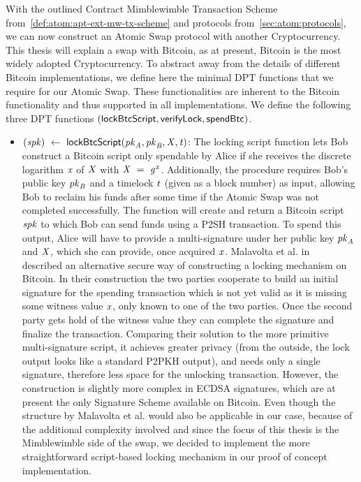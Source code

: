 With the outlined Contract Mimblewimble Transaction Scheme from~\cref{def:atom:apt-ext-mw-tx-scheme} and protocols from~\cref{sec:atom:protocols}, we can now construct an Atomic Swap protocol with another Cryptocurrency.
This thesis will explain a swap with Bitcoin, as at present, Bitcoin is the most widely adopted Cryptocurrency.
To abstract away from the details of different Bitcoin implementations, we define here the minimal DPT functions that we require for our Atomic Swap.
These functionalities are inherent to the Bitcoin functionality and thus supported in all implementations.
We define the following three DPT functions $(\mathsf{lockBtcScript}, \mathsf{verifyLock}, \mathsf{spendBtc})$.
\begin{itemize}
    \item $(\mathit{spk}) ~\leftarrow~ \mathsf{lockBtcScript} (\mathit{pk}_{\mathit{A}},\mathit{pk}_{\mathit{B}},\mathit{X},\mathit{t})$:
    The locking script function lets Bob construct a Bitcoin script only spendable by Alice if she receives the discrete logarithm $\mathit{x}$ of $\mathit{X}$ with $\mathit{X} ~=~ \mathit{g}^{\mathit{x}}$.
    Additionally, the procedure requires Bob's public key $\mathit{pk}_{\mathit{B}}$ and a timelock $\mathit{t}$ (given as a block number) as input, allowing Bob to reclaim his funds after some time if the Atomic Swap was not completed successfully.
    The function will create and return a Bitcoin script $\mathit{spk}$ to which Bob can send funds using a P2SH transaction.
    To spend this output, Alice will have to provide a multi-signature under her public key $\mathit{pk}_{\mathit{A}}$ and $\mathit{X}$, which she can provide, once acquired $\mathit{x}$.
    Malavolta et al. in~\cite{malavolta2019anonymous} described an alternative secure way of constructing a locking mechanism on Bitcoin.
    In their construction the two parties cooperate to build an initial signature for the spending transaction which is not yet valid as it is missing some witness value $\mathit{x}$, only known to one of the two parties.
    Once the second party gets hold of the witness value they can complete the signature and finalize the transaction.
    Comparing their solution to the more primitive multi-signature script, it achieves greater privacy (from the outside, the lock output looks like a standard P2PKH output), and needs only a single signature, therefore less space for the unlocking transaction.
    However, the construction is slightly more complex in ECDSA signatures, which are at present the only Signature Scheme available on Bitcoin.
    Even though the structure by Malavolta et al. would also be applicable in our case, because of the additional complexity involved and since the focus of this thesis is the Mimblewimble side of the swap, we decided to implement the more straightforward script-based locking mechanism in our proof of concept implementation.

\end{itemize}
